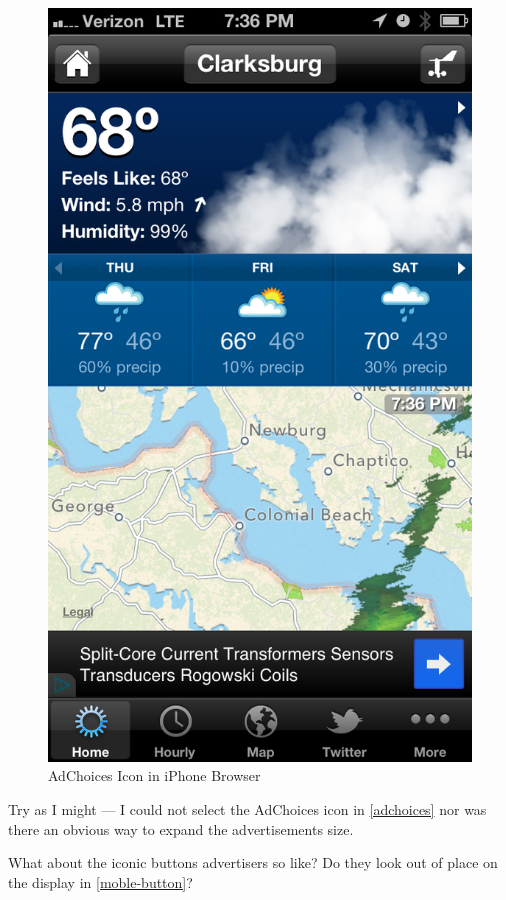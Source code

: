 \begin{figure}
\centerline{
\includegraphics[scale=.2]{chapter8.tex/adchoices-mobile}
}
\caption{AdChoices Icon in iPhone Browser}
\label{adchoices}
\end{figure}


Try as I might --- I could not select the AdChoices icon in  \autoref{adchoices}  nor was there an obvious way to expand the advertisements size. 

What about the iconic buttons advertisers so like? Do they look out of place on the display in  \autoref{moble-button}? 


